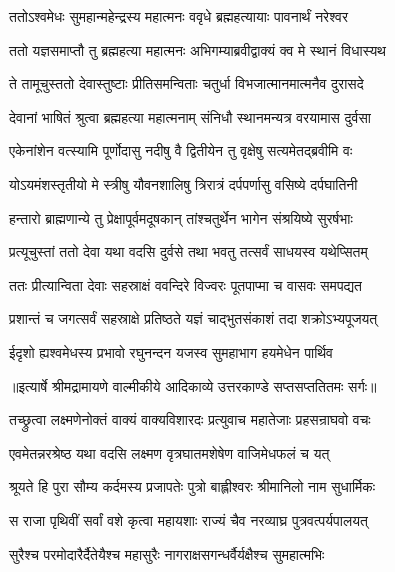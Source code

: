 \twolineshloka
{ततोऽश्वमेधः सुमहान्महेन्द्रस्य महात्मनः}
{ववृधे ब्रह्महत्यायाः पावनार्थं नरेश्वर} %

\twolineshloka
{ततो यज्ञसमाप्तौ तु ब्रह्महत्या महात्मनः}
{अभिगम्याब्रवीद्वाक्यं क्व मे स्थानं विधास्यथ} %

\twolineshloka
{ते तामूचुस्ततो देवास्तुष्टाः प्रीतिसमन्विताः}
{चतुर्धा विभजात्मानमात्मनैव दुरासदे} %

\twolineshloka
{देवानां भाषितं श्रुत्वा ब्रह्महत्या महात्मनाम्}
{संनिधौ स्थानमन्यत्र वरयामास दुर्वसा} %

\twolineshloka
{एकेनांशेन वत्स्यामि पूर्णोदासु नदीषु वै}
{द्वितीयेन तु वृक्षेषु सत्यमेतद्ब्रवीमि वः} %

\twolineshloka
{योऽयमंशस्तृतीयो मे स्त्रीषु यौवनशालिषु}
{त्रिरात्रं दर्पपर्णासु वसिष्ये दर्पघातिनी} %

\twolineshloka
{हन्तारो ब्राह्मणान्ये तु प्रेक्षापूर्वमदूषकान्}
{तांश्चतुर्थेन भागेन संश्रयिष्ये सुरर्षभाः} %

\twolineshloka
{प्रत्यूचुस्तां ततो देवा यथा वदसि दुर्वसे}
{तथा भवतु तत्सर्वं साधयस्व यथेप्सितम्} %

\twolineshloka
{ततः प्रीत्यान्विता देवाः सहस्राक्षं ववन्दिरे}
{विज्वरः पूतपाप्मा च वासवः समपद्यत} %

\twolineshloka
{प्रशान्तं च जगत्सर्वं सहस्राक्षे प्रतिष्ठते}
{यज्ञं चाद्भुतसंकाशं तदा शक्रोऽभ्यपूजयत्} %

\twolineshloka
{ईदृशो ह्यश्वमेधस्य प्रभावो रघुनन्दन}
{यजस्व सुमहाभाग हयमेधेन पार्थिव} %


{॥इत्यार्षे श्रीमद्रामायणे वाल्मीकीये आदिकाव्ये उत्तरकाण्डे सप्तसप्ततितमः सर्गः॥}


\twolineshloka
{तच्छ्रुत्वा लक्ष्मणेनोक्तं वाक्यं वाक्यविशारदः}
{प्रत्युवाच महातेजाः प्रहसन्राघवो वचः} %

\twolineshloka
{एवमेतन्नरश्रेष्ठ यथा वदसि लक्ष्मण}
{वृत्रघातमशेषेण वाजिमेधफलं च यत्} %

\twolineshloka
{श्रूयते हि पुरा सौम्य कर्दमस्य प्रजापतेः}
{पुत्रो बाह्लीश्वरः श्रीमानिलो नाम सुधार्मिकः} %

\twolineshloka
{स राजा पृथिवीं सर्वां वशे कृत्वा महायशाः}
{राज्यं चैव नरव्याघ्र पुत्रवत्पर्यपालयत्} %

\twolineshloka
{सुरैश्च परमोदारैर्दैतेयैश्च महासुरैः}
{नागराक्षसगन्धर्वैर्यक्षैश्च सुमहात्मभिः} %

